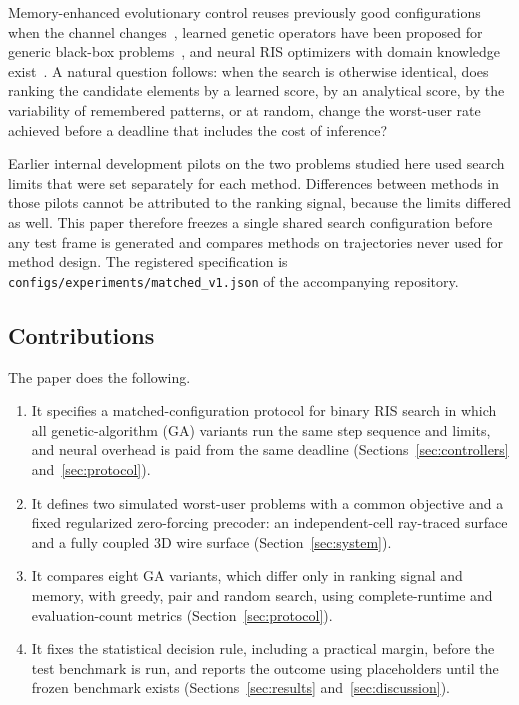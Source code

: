 \documentclass[conference]{IEEEtran}
\begin{document}
Memory-enhanced evolutionary control reuses previously good configurations when the channel changes~\cite{zardi}, learned genetic operators have been proposed for generic black-box problems~\cite{lange}, and neural RIS optimizers with domain knowledge exist~\cite{risnet}. A natural question follows: when the search is otherwise identical, does ranking the candidate elements by a learned score, by an analytical score, by the variability of remembered patterns, or at random, change the worst-user rate achieved before a deadline that includes the cost of inference?

Earlier internal development pilots on the two problems studied here used search limits that were set separately for each method. Differences between methods in those pilots cannot be attributed to the ranking signal, because the limits differed as well. This paper therefore freezes a single shared search configuration before any test frame is generated and compares methods on trajectories never used for method design. The registered specification is \texttt{configs/experiments/matched\_v1.json} of the accompanying repository.

\subsection*{Contributions}
The paper does the following.
\begin{enumerate}
\item %
It specifies a matched-configuration protocol for binary RIS search in which all genetic-algorithm (GA) variants run the same step sequence and limits, and neural overhead is paid from the same deadline (Sections~\ref{sec:controllers} and~\ref{sec:protocol}).
\item %
It defines two simulated worst-user problems with a common objective and a fixed regularized zero-forcing precoder: an independent-cell ray-traced surface and a fully coupled 3D wire surface (Section~\ref{sec:system}).
\item %
It compares eight GA variants, which differ only in ranking signal and memory, with greedy, pair and random search, using complete-runtime and evaluation-count metrics (Section~\ref{sec:protocol}).
\item %
It fixes the statistical decision rule, including a practical margin, before the test benchmark is run, and reports the outcome using placeholders until the frozen benchmark exists (Sections~\ref{sec:results} and~\ref{sec:discussion}).
\end{enumerate}
\end{document}
